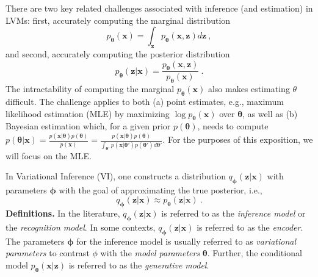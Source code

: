 \documentclass{article}
\newcommand{\x}{\mathbf{x}}
\newcommand{\z}{\mathbf{z}}
\newcommand{\ttheta}{\boldsymbol{\theta}}
\newcommand{\pphi}{\boldsymbol{\phi}}
\begin{document}
There are two key related challenges associated with inference (and estimation) in LVMs: first, accurately computing the marginal distribution
\begin{equation}
	p_{\ttheta}(\x) = \int_{\z} p_{\ttheta}(\x,\z) d\z~,
\end{equation}
and second, accurately computing the posterior distribution
\begin{equation}
	p_{\ttheta}(\z|\x) = \frac{p_{\ttheta}(\x,\z)}{p_{\ttheta}(\x)}~.
\end{equation}
The intractability of computing the marginal $p_{\ttheta}(\x)$ also makes estimating $\theta$ difficult. The challenge applies to both 
(a) point estimates, e.g., maximum likelihood estimation (MLE) by maximizing $\log p_{\ttheta}(\x)$ over $\ttheta$, as well as 
(b) Bayesian estimation which, for a given prior $p(\ttheta)$, needs to compute 
$p(\ttheta|\x) = \frac{p(\x|\ttheta) p(\ttheta)}{p(\x)}  = \frac{p(\x|\ttheta) p(\ttheta)}{\int_{\ttheta'} p(\x|\ttheta') p(\ttheta') d\ttheta'}$. For the purposes of this exposition, we will focus on the MLE.

In Variational Inference (VI), one constructs a distribution $q_{\pphi}(\z|\x)$ with parameters $\pphi$ with the goal of approximating the true posterior, i.e.,
\begin{equation}
	q_{\pphi}(\z|\x) \approx p_{\ttheta}(\z|\x)~.
\end{equation}
{\bf Definitions.} In the literature, $q_{\pphi}(\z|\x)$ is referred to as the {\em inference model} or the {\em recognition model}. In some contexts, $q_{\pphi}(\z|\x)$ is referred to as the {\em encoder}. The parameters $\pphi$ for the inference model is usually referred to as {\em variational parameters} to contrast $\phi$ with the {\em model parameters} $\ttheta$. Further, the conditional model $p_{\ttheta}(\x|\z)$ is referred to as the {\em generative model}.
\end{document}
